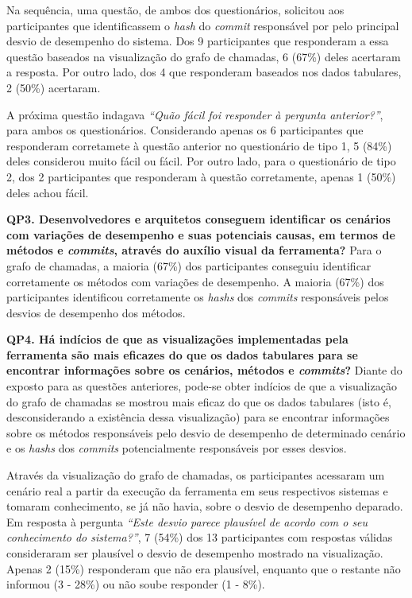Na sequência, uma questão, de ambos dos questionários, solicitou aos participantes que identificassem o \textit{hash} do \textit{commit} responsável por pelo principal desvio de desempenho do sistema. Dos 9 participantes que responderam a essa questão baseados na visualização do grafo de chamadas, 6 (67\%) deles acertaram a resposta. Por outro lado, dos 4 que responderam baseados nos dados tabulares, 2 (50\%) acertaram.

A próxima questão indagava \textit{``Quão fácil foi responder à pergunta anterior?''}, para ambos os questionários. Considerando apenas os 6 participantes que responderam corretamete à questão anterior no questionário de tipo 1, 5 (84\%) deles considerou muito fácil ou fácil. Por outro lado, para o questionário de tipo 2, dos 2 participantes que responderam à questão corretamente, apenas 1 (50\%) deles achou fácil.

\begin{framed}
\noindent \textbf{QP3. Desenvolvedores e arquitetos conseguem identificar os cenários com variações de desempenho e suas potenciais causas, em termos de métodos e \textit{commits}, através do auxílio visual da ferramenta?} Para o grafo de chamadas, a maioria (67\%) dos participantes conseguiu identificar corretamente os métodos com variações de desempenho. A maioria (67\%) dos participantes identificou corretamente os \textit{hashs} dos \textit{commits} responsáveis pelos desvios de desempenho dos métodos.
\end{framed}

\begin{framed}
\noindent \textbf{QP4. Há indícios de que as visualizações implementadas pela ferramenta são mais eficazes do que os dados tabulares para se encontrar informações sobre os cenários, métodos e \textit{commits}?} Diante do exposto para as questões anteriores, pode-se obter indícios de que a visualização do grafo de chamadas se mostrou mais eficaz do que os dados tabulares (isto é, desconsiderando a existência dessa visualização) para se encontrar informações sobre os métodos responsáveis pelo desvio de desempenho de determinado cenário e os \textit{hashs} dos \textit{commits} potencialmente responsáveis por esses desvios.
\end{framed}

Através da visualização do grafo de chamadas, os participantes acessaram um cenário real a partir da execução da ferramenta em seus respectivos sistemas e tomaram conhecimento, se já não havia, sobre o desvio de desempenho deparado. Em resposta à pergunta \textit{``Este desvio parece plausível de acordo com o seu conhecimento do sistema?''}, 7 (54\%) dos 13 participantes com respostas válidas consideraram ser plausível o desvio de desempenho mostrado na visualização. Apenas 2 (15\%) responderam que não era plausível, enquanto que o restante não informou (3 - 28\%) ou não soube responder (1 - 8\%).

